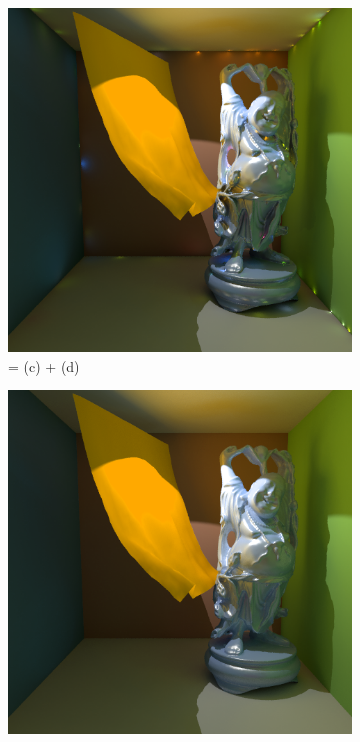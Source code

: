 \begin{figure}\label{f:ssbc-1}
\begin{center}
	\begin{subfigure}[b]{0.195\textwidth}
		\includegraphics[width=1.0\textwidth]{graphics/ir/ir-7-1}
		\caption{= (c) + (d)}
	\end{subfigure}
	\begin{subfigure}[b]{0.195\textwidth}
		\includegraphics[width=1.0\textwidth]{graphics/ir/ir-7-4}

\end{subfigure}
\end{center}
\end{figure}
